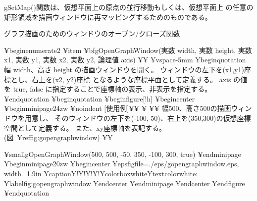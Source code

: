 gSetMap()関数は、仮想平面上の原点の並行移動もしくは、仮想平面上
の任意の矩形領域を描画ウィンドウに再マッピングするためのものである。

%
%

グラフ描画のためのウィンドウのオープン/クローズ関数 

¥begin{enumerate2}
¥item {¥bf{gOpenGraphWindow(実数 width, 実数 height, 実数 x1, 実数 y1, 実数 x2, 実数 y2, 論理値 axis)}} ¥¥
¥vspace{-5mm}
   ¥begin{quotation}
   幅 width、高さ height の描画ウィンドウを開く。
   ウィンドウの左下を(x1,y1)座標とし、右上を(x2, y2)座標
   となるような座標平面として定義する。
   axis の値を true, false に指定することで座標軸の表示、非表示を指定する。
   ¥end{quotation}
   ¥begin{quotation}
¥begin{figure}[!h]
¥begin{center}
¥begin{minipage}{24zw}
	   ¥noindent $[$使用例$]$¥¥
¥ ¥¥
幅500、高さ500の描画ウィンドウを用意し、
そのウィンドウの左下を(-100,-50)、右上を(350,300)の仮想座標空間として定義する。
また、xy座標軸を表記する。(図~¥ref{fig:gopengraphwindow}) ¥¥

{¥small{gOpenGraphWindow(500, 500, -50, 350, -100, 300, true)}}
¥end{minipage}
¥begin{minipage}{20zw}
¥begin{center}
¥epsfig{file=./eps/gopengraphwindow.eps, width=1.9in}
¥caption{$¥!¥!¥!¥!$¥colorbox{white}{{¥textcolor{white}{:}}}}
¥label{fig:gopengraphwindow}
¥end{center}
¥end{minipage}
¥end{center}
¥end{figure}
   ¥end{quotation}



